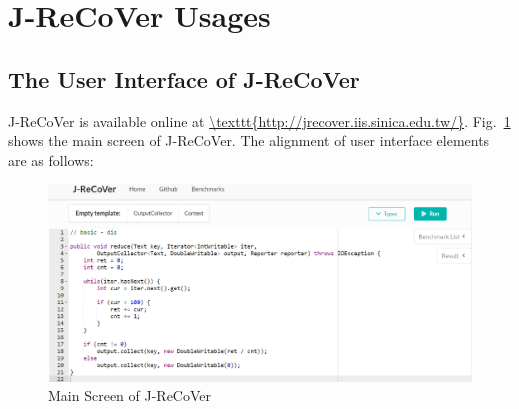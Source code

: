 % 
\clearpage
\appendix

\section{J-ReCoVer Usages}

\subsection{The User Interface of J-ReCoVer}
\label{appendix:1}

J-ReCoVer is available online at \url{\texttt{http://jrecover.iis.sinica.edu.tw/}}. Fig.~\ref{fig:main_screen} shows the main screen of J-ReCoVer. The alignment of user interface elements are as follows:

\begin{figure}
\begin{center}
\includegraphics[width=.9\linewidth]{screenshots/main_screen.eps}
\caption{Main Screen of J-ReCoVer}
\label{fig:main_screen}
\end{center}
\end{figure}

